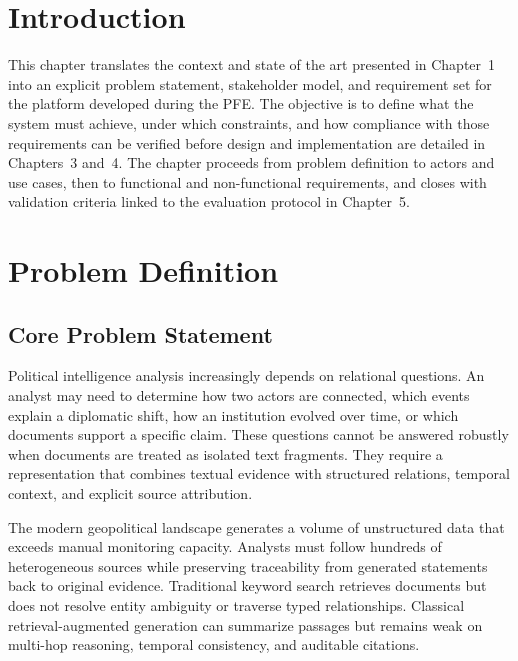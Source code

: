 

\section{Introduction}

This chapter translates the context and state of the art presented in Chapter~1 into an explicit problem statement, stakeholder model, and requirement set for the platform developed during the PFE. The objective is to define what the system must achieve, under which constraints, and how compliance with those requirements can be verified before design and implementation are detailed in Chapters~3 and~4. The chapter proceeds from problem definition to actors and use cases, then to functional and non-functional requirements, and closes with validation criteria linked to the evaluation protocol in Chapter~5.

\section{Problem Definition}

\subsection{Core Problem Statement}

Political intelligence analysis increasingly depends on relational questions. An analyst may need to determine how two actors are connected, which events explain a diplomatic shift, how an institution evolved over time, or which documents support a specific claim. These questions cannot be answered robustly when documents are treated as isolated text fragments. They require a representation that combines textual evidence with structured relations, temporal context, and explicit source attribution.

The modern geopolitical landscape generates a volume of unstructured data that exceeds manual monitoring capacity. Analysts must follow hundreds of heterogeneous sources while preserving traceability from generated statements back to original evidence. Traditional keyword search retrieves documents but does not resolve entity ambiguity or traverse typed relationships. Classical retrieval-augmented generation can summarize passages but remains weak on multi-hop reasoning, temporal consistency, and auditable citations.

